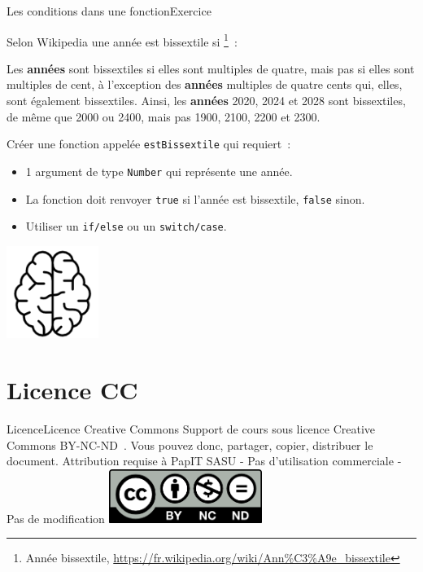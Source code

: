 \documentclass{beamer}
\begin{document}
\begin{frame}{Les conditions dans une fonction}{Exercice \execcounterdispinc{}}
    \begin{footnotesize}
        Selon Wikipedia une année est bissextile si \footnote{Année bissextile, \url{https://fr.wikipedia.org/wiki/Ann\%C3\%A9e_bissextile}}~:
        \begin{textit}
            Les \textbf{années} sont bissextiles si elles sont multiples de quatre, mais pas si elles sont multiples de cent, à l'exception des \textbf{années} multiples de quatre cents qui, elles, sont également bissextiles.
            Ainsi, les \textbf{années} 2020, 2024 et 2028 sont bissextiles, de même que 2000 ou 2400, mais pas 1900, 2100, 2200 et 2300.
        \end{textit}
        \bigbreak
        Créer une fonction appelée \lstinline{estBissextile} qui requiert~:
        \begin{itemize}
            \item 1 argument de type \lstinline{Number} qui représente une année.
            \item La fonction doit renvoyer
                  \lstinline{true} si l'année est bissextile, \lstinline{false} sinon.
            \item Utiliser un \lstinline{if/else} ou un \lstinline{switch/case}.
        \end{itemize}
    \end{footnotesize}
    \bigbreak
    \centering
    \includegraphics[width=3cm]{image/intelligence}
\end{frame}

\section{Licence CC}\label{sec:licence}

\begin{frame}{Licence}{Licence Creative Commons}
    Support de cours sous licence Creative Commons BY-NC-ND~.
    \bigbreak
    Vous pouvez donc, partager, copier, distribuer le document.
    \bigbreak
    Attribution requise à PapIT SASU - Pas d’utilisation commerciale - Pas de modification
    \bigbreak
    \centering
    \includegraphics[width=5cm]{image/by-nc-nd-logo}
\end{frame}
\end{document}
